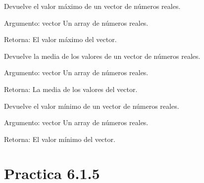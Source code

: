 \documentclass[letterpaper,10pt,spanish]{sphinxmanual}
\begin{document}
\begin{fulllineitems}
\label{\detokenize{pr6:pr6.1_4.maximo}}
\pysigstartsignatures
{}
\pysigstopsignatures
\sphinxAtStartPar
Devuelve el valor máximo de un vector de números reales.

\sphinxAtStartPar
Argumento:
vector \textendash{} Un array de números reales.

\sphinxAtStartPar
Retorna:
El valor máximo del vector.

\end{fulllineitems}


\begin{fulllineitems}
\label{\detokenize{pr6:pr6.1_4.media}}
\pysigstartsignatures
{}
\pysigstopsignatures
\sphinxAtStartPar
Devuelve la media de los valores de un vector de números reales.

\sphinxAtStartPar
Argumento:
vector \textendash{} Un array de números reales.

\sphinxAtStartPar
Retorna:
La media de los valores del vector.

\end{fulllineitems}


\begin{fulllineitems}
\label{\detokenize{pr6:pr6.1_4.minimo}}
\pysigstartsignatures
{}
\pysigstopsignatures
\sphinxAtStartPar
Devuelve el valor mínimo de un vector de números reales.

\sphinxAtStartPar
Argumento:
vector \textendash{} Un array de números reales.

\sphinxAtStartPar
Retorna:
El valor mínimo del vector.

\end{fulllineitems}



\section{Practica 6.1.5}
\label{\detokenize{pr6:module-pr6.1_5}}\label{\detokenize{pr6:practica-6-1-5}}
\end{document}
